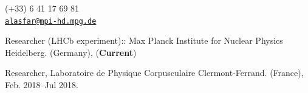 \documentclass[11pt,article,oneside]{memoir}
\makeatletter
\def\myemail{alasfar@mpi-hd.mpg.de}
\def\myphone{(+33) 6 41 17 69 81}
\makeatother
\begin{document}

\pagestyle{kjh}
\thispagestyle{kjhgit}


\begin{minipage}[t]{2.95in}
  
\end{minipage}
\hfill     
\hfill
\begin{minipage}[t]{1.4in}
  \flushright \footnotesize  \addressblock \myphone \, \faPhone \\ 
  {\scriptsize  \texttt{\href{mailto:\myemail}{\myemail}} \, \faEnvelope} \\
\end{minipage}

\medskip

\reversemarginpar

\bigskip       


 \medskip
{}

\ind Researcher (LHCb experiment):: Max Planck Institute for Nuclear Physics Heidelberg. (Germany), (\textbf{Current}) \normalsize \vspace{0.05in}

\ind Researcher, Laboratoire de Physique Corpusculaire Clermont-Ferrand. (France),  Feb. 2018--Jul 2018.
\end{document}
